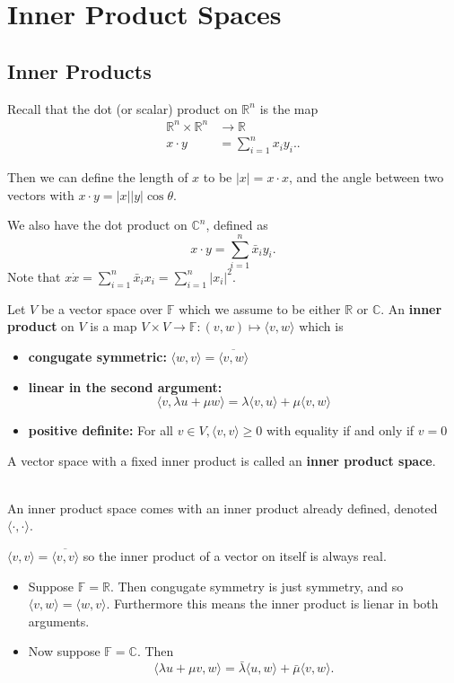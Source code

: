 \section{Inner Product Spaces}

\subsection{Inner Products}

Recall that the dot (or scalar) product on $\mathbb{R}^n$ is the map
\begin{align*}
  \mathbb{R}^n \times \mathbb{R}^n &\rightarrow \mathbb{R} \\
  x \cdot y &= \sum_{ i = 1}^{n} x_i y_i.
.\end{align*}

Then we can define the length of $x$ to be $|x| = x \cdot x$, and the angle between two vectors with $x \cdot y = |x||y| \cos \theta$.

We also have the dot product on $\mathbb{C}^n$, defined as
\[x \cdot y = \sum_{ i = 1}^{n} \bar{x}_i y_i.\]
Note that $x \dot x = \sum_{ i = 1}^{n} \bar{x}_i x_i = \sum_{ i = 1}^{n} |x_i|^2$.

\begin{definition}
  Let $V$ be a vector space over $\mathbb{F}$ which we assume to be either $\mathbb{R}$ or $\mathbb{C}$. An {\bf inner product} on $V$ is a map $V \times V \rightarrow \mathbb{F} : (v, w) \mapsto \langle v, w \rangle$ which is
  \begin{itemize}
    \item {\bf congugate symmetric:} $\langle w, v \rangle = \overline{\langle v, w \rangle}$
  \item {\bf linear in the second argument:} 
    \[\langle v, \lambda u + \mu w \rangle = \lambda \langle v, u \rangle + \mu \langle v, w \rangle\]
\item {\bf positive definite:} For all $v \in V, \langle v, v \rangle \geq 0$ with equality if and only if $v = 0$
  \end{itemize}
  A vector space with a fixed inner product is called an {\bf inner product space}.
\end{definition}
$ $ \\
An inner product space comes with an inner product already defined, denoted $\langle \cdot, \cdot \rangle$.

\begin{remark} $\langle v, v \rangle = \overline{\langle v, v \rangle}$ so the inner product of a vector on itself is always real.
    \begin{itemize}
      \item Suppose $\mathbb{F} = \mathbb{R}$. Then congugate symmetry is just symmetry, and so $\langle v, w \rangle = \langle w, v \rangle$. Furthermore this means the inner product is lienar in both arguments.
      \item Now suppose $\mathbb{F} = \mathbb{C}$. Then
        \[\langle \lambda u + \mu v, w \rangle = \bar{\lambda} \langle u, w \rangle + \bar{\mu} \langle v, w \rangle.\]
    \end{itemize}
\end{remark}


